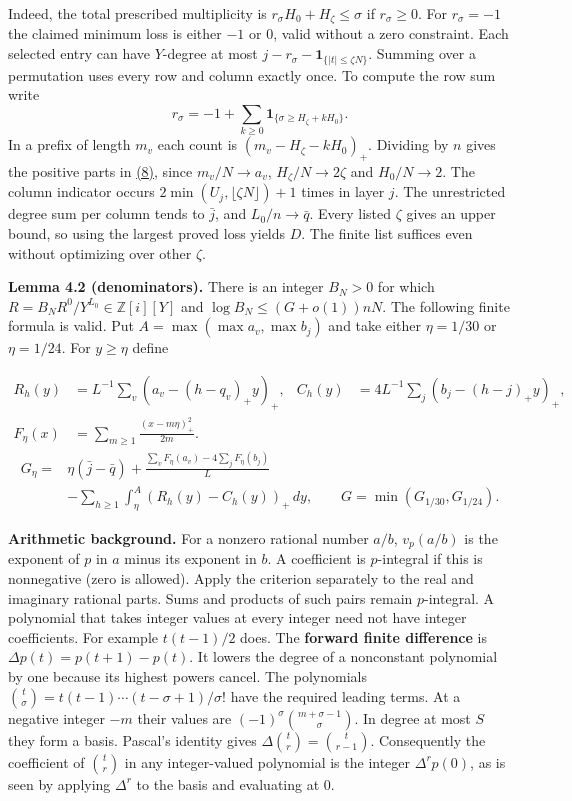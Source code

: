 \documentclass[11pt,a4paper]{article}
\begin{document}
Indeed, the total prescribed multiplicity is \(r_\sigma H_0+H_\zeta\le\sigma\) if \(r_\sigma\ge0\). For \(r_\sigma=-1\) the claimed minimum loss is either \(-1\) or \(0\), valid without a zero constraint. Each selected entry can have \(Y\)-degree at most \(j-r_\sigma-\mathbf1_{\{|t|\le\zeta N\}}\). Summing over a permutation uses every row and column exactly once. To compute the row sum write \[
 r_\sigma=-1+\sum_{k\ge0}\mathbf1_{\{\sigma\ge H_\zeta+kH_0\}} .
\] In a prefix of length \(m_v\) each count is \((m_v-H_\zeta-kH_0)_+\). Dividing by \(n\) gives the positive parts in \hyperref[eq:8]{(8)}, since \(m_v/N\to a_v\), \(H_\zeta/N\to2\zeta\) and \(H_0/N\to2\). The column indicator occurs \(2\min(U_j,\lfloor\zeta N\rfloor)+1\) times in layer \(j\). The unrestricted degree sum per column tends to \(\bar j\), and \(L_0/n\to\bar q\). Every listed \(\zeta\) gives an upper bound, so using the largest proved loss yields \(D\). The finite list suffices even without optimizing over other \(\zeta\).

\textbf{Lemma 4.2 (denominators).} There is an integer \(B_N>0\) for which \(R=B_NR^0/Y^{L_0}\in\mathbb Z[i][Y]\) and \(\log B_N\le (G+o(1))nN\). The following finite formula is valid. Put \(A=\max(\max a_v,\max b_j)\) and take either \(\eta=1/30\) or \(\eta=1/24\). For \(y\ge\eta\) define

\[
 \begin{aligned}
 R_h(y)&=L^{-1}\sum_v(a_v-(h-q_v)_+y)_+,&
 C_h(y)&=4L^{-1}\sum_j(b_j-(h-j)_+y)_+,\\
 F_\eta(x)&=\sum_{m\ge1}\frac{(x-m\eta)_+^2}{2m}.&&
 \end{aligned}
\] \[
 \begin{aligned}
 G_\eta={}&\eta(\bar j-\bar q)+
 \frac{\sum_v F_\eta(a_v)-4\sum_j F_\eta(b_j)}{L}\\
 &-\sum_{h\ge1}\int_\eta^{A}(R_h(y)-C_h(y))_+\,dy,\qquad
 G=\min(G_{1/30},G_{1/24}).
 \end{aligned}\tag{9}\label{eq:9}
\]

\textbf{Arithmetic background.} For a nonzero rational number \(a/b\), \(v_p(a/b)\) is the exponent of \(p\) in \(a\) minus its exponent in \(b\). A coefficient is \(p\)-integral if this is nonnegative (zero is allowed). Apply the criterion separately to the real and imaginary rational parts. Sums and products of such pairs remain \(p\)-integral. A polynomial that takes integer values at every integer need not have integer coefficients. For example \(t(t-1)/2\) does. The \textbf{forward finite difference} is \(\Delta p(t)=p(t+1)-p(t)\). It lowers the degree of a nonconstant polynomial by one because its highest powers cancel. The polynomials \(\binom t\sigma=t(t-1)\cdots(t-\sigma+1)/\sigma!\) have the required leading terms. At a negative integer \(-m\) their values are \((-1)^\sigma\binom{m+\sigma-1}{\sigma}\). In degree at most \(S\) they form a basis. Pascal's identity gives \(\Delta\binom tr=\binom t{r-1}\). Consequently the coefficient of \(\binom tr\) in any integer-valued polynomial is the integer \(\Delta^r p(0)\), as is seen by applying \(\Delta^r\) to the basis and evaluating at \(0\).
\end{document}
